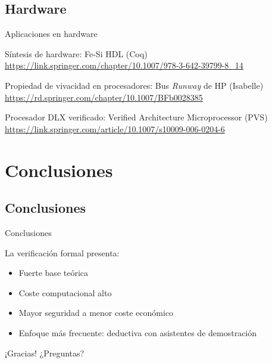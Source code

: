 \subsection{Hardware}

\begin{frame}{Aplicaciones en hardware}

Síntesis de hardware: Fe-Si HDL (Coq)
{\scriptsize\url{https://link.springer.com/chapter/10.1007/978-3-642-39799-8_14}}

Propiedad de vivacidad en procesadores: Bus \textit{Runway} de HP (Isabelle)
{\scriptsize\url{https://rd.springer.com/chapter/10.1007/BFb0028385}}

Procesador DLX verificado: Verified Architecture Microprocessor (PVS)
{\scriptsize\url{https://link.springer.com/article/10.1007/s10009-006-0204-6}}

\end{frame}


\section{Conclusiones}
\subsection{Conclusiones}

\begin{frame}{Conclusiones}

La verificación formal presenta:
\begin{itemize}
\item Fuerte base teórica
\item Coste computacional alto
\item Mayor seguridad a menor coste económico
\item Enfoque más frecuente: deductiva con asistentes de demostración
\end{itemize}
\end{frame}

\begin{frame}[standout]
  ¡Gracias! ¿Preguntas?
\end{frame}

